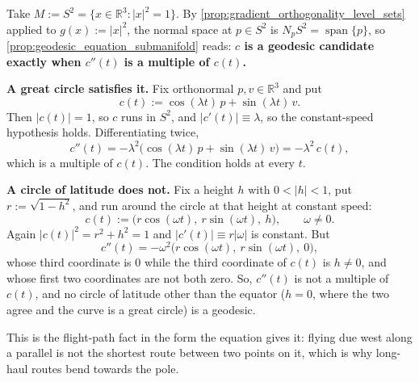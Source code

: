 \begin{aiexample}
\label{ex:great_circles_geodesics}
Take $M := S^2 = \{x \in \mathbb{R}^3 : \lvert x\rvert^2 = 1\}$. By
\cref{prop:gradient_orthogonality_level_sets} applied to $g(x) := \lvert x\rvert^2$, the normal
space at $p \in S^2$ is $N_pS^2 = \operatorname{span}\{p\}$, so
\cref{prop:geodesic_equation_submanifold} reads: \textbf{$c$ is a geodesic candidate exactly when
$c''(t)$ is a multiple of $c(t)$.}

\textbf{A great circle satisfies it.} Fix orthonormal $p,v \in \mathbb{R}^3$ and put
\[c(t) := \cos(\lambda t)\,p + \sin(\lambda t)\,v.\]
Then $\lvert c(t)\rvert = 1$, so $c$ runs in $S^2$, and $\lvert c'(t)\rvert \equiv \lambda$, so
the constant-speed hypothesis holds. Differentiating twice,
\[c''(t) = -\lambda^2\big(\cos(\lambda t)\,p + \sin(\lambda t)\,v\big) = -\lambda^2\,c(t),\]
which is a multiple of $c(t)$. The condition holds at every $t$.

\textbf{A circle of latitude does not.} Fix a height $h$ with $0 < \lvert h\rvert < 1$, put
$r := \sqrt{1-h^2}$, and run around the circle at that height at constant speed:
\[c(t) := \big(r\cos(\omega t),\ r\sin(\omega t),\ h\big), \qquad \omega \neq 0.\]
Again $\lvert c(t)\rvert^2 = r^2+h^2 = 1$ and $\lvert c'(t)\rvert \equiv r\lvert\omega\rvert$ is
constant. But
\[c''(t) = -\omega^2\big(r\cos(\omega t),\ r\sin(\omega t),\ 0\big),\]
whose third coordinate is $0$ while the third coordinate of $c(t)$ is $h \neq 0$, and whose first
two coordinates are not both zero. So, $c''(t)$ is not a multiple of $c(t)$, and no circle of
latitude other than the equator ($h=0$, where the two agree and the curve is a great circle) is a
geodesic.

This is the flight-path fact in the form the equation gives it: flying due west along a parallel
is not the shortest route between two points on it, which is why long-haul routes bend towards
the pole.
\end{aiexample}

